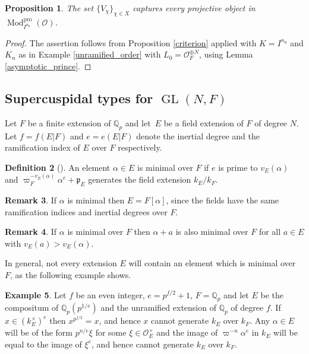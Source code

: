 \documentclass[11pt]{article}
\let\mathcal\mathscr
\newtheorem{prop}{Proposition}[section]
\theoremstyle{definition}
\newtheorem{defi}[prop]{Definition}
\newtheorem{examp}[prop]{Example}
\newtheorem{remark}[prop]{Remark}
\DeclareMathOperator{\GL}{GL}
\DeclareMathOperator{\Mod}{Mod}
\newcommand{\Qp}{\mathbb {Q}_p}
\newcommand{\cO}{\mathcal{O}}
\newcommand{\pp}{\mathfrak p}
\newcommand{\pro}{\mathrm{pro}}
\begin{document}
\begin{prop} The set $\{ V_{\chi}\}_ {\chi\in X}$ captures every projective object in $\Mod^{\pro}_{I^{n_0}}(\cO)$.
\end{prop}

\begin{proof} The assertion follows from Proposition \ref{criterion} applied with $K=I^{n_0}$ and $K_n$ as in Example \ref{unramified_order} with $L_0= \cO_F^{\oplus N}$,
using Lemma \ref{asymptotic_prince}.
\end{proof}

\subsection{Supercuspidal types for $\GL(N, F)$}\label{sec_super}
Let $F$ be a finite extension of $\Qp$ and let~$E$ be a field extension of $F$ of degree $N$. Let $f=f(E|F)$ and $e=e(E|F)$ denote the inertial degree and the ramification
index of $E$ over $F$ respectively.

\begin{defi}[{\cite[(1.4.14)]{BK}}] An element $\alpha\in E$ is minimal over $F$ if $e$ is prime to $v_E(\alpha)$ and $\varpi_F^{-v_E(\alpha)} \alpha^e +\pp_E$ generates
the field extension $k_E/k_F$.
\end{defi}

\begin{remark} If $\alpha$ is minimal then $E=F[\alpha]$, since the fields have the same ramification indices and inertial degrees over $F$.
\end{remark}

\begin{remark} If $\alpha$ is minimal over $F$ then $\alpha +a$ is also minimal over $F$ for all $a\in E$ with $v_E(a)> v_E(\alpha)$.
\end{remark}

In general, not every extension $E$ will contain an element which is minimal over~$F$, as the following example shows.

\begin{examp} Let $f$ be an even integer, $e=p^{f/2}+1$, $F=\Qp$ and let $E$ be the compositum of $\Qp(p^{1/e})$ and the unramified extension
of $\Qp$ of degree $f$. If $x\in (k_E^{\times})^e$ then $x^{p^{f/2}}=x$, and hence $x$ cannot generate $k_E$ over $k_F$. Any $\alpha\in E$ will
be of the form $p^{n/e}\xi$ for some $\xi\in \cO_E^{\times}$ and the image of $\varpi^{-n} \alpha^e$ in $k_E$ will be equal to the image of $\xi^e$,
and hence cannot generate $k_E$ over $k_F$.
\end{examp}
\end{document}
